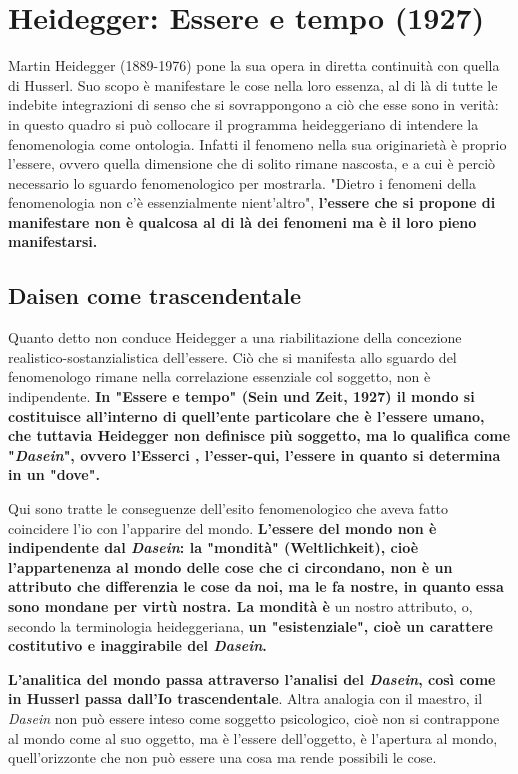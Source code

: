 \section{Heidegger: Essere e tempo (1927)}

Martin Heidegger (1889-1976) pone la sua opera in
diretta continuità con quella di Husserl. Suo scopo
è manifestare le cose nella loro essenza, al di là di
tutte le indebite integrazioni di senso che si sovrappongono a ciò che esse sono in verità: in questo quadro
si può collocare il programma heideggeriano di intendere
la fenomenologia come ontologia. Infatti il fenomeno
nella sua originarietà è proprio l'essere, ovvero quella dimensione
che di solito rimane nascosta, e a cui è perciò necessario
lo sguardo fenomenologico per mostrarla. "Dietro i
fenomeni della fenomenologia non c'è essenzialmente
nient'altro", \textbf{l'essere che si propone di manifestare non è
qualcosa al di là dei fenomeni ma è il loro pieno manifestarsi.}

\subsection{Daisen come trascendentale}

Quanto detto non conduce Heidegger a una
riabilitazione della concezione realistico-sostanzialistica dell'essere. Ciò che si manifesta allo sguardo
del fenomenologo rimane nella correlazione
essenziale col soggetto, non è indipendente.
\textbf{In "Essere e tempo" (Sein und Zeit, 1927) il mondo
si costituisce all'interno di quell'ente particolare che
è l'essere umano, che tuttavia Heidegger non
definisce più soggetto, ma lo qualifica come
"\textit{Dasein}", ovvero l'Esserci , l'esser-qui, l'essere in
quanto si determina in un "dove".}

Qui sono tratte le
conseguenze dell'esito fenomenologico che aveva fatto
coincidere l'io con l'apparire del mondo.
\textbf{L'essere del mondo non è indipendente dal \textit{Dasein}: la
"mondità" (Weltlichkeit), cioè l'appartenenza al mondo
delle cose che ci circondano, non è un attributo che
differenzia le cose da noi, ma le fa nostre, in quanto
essa sono mondane per virtù nostra. La mondità è}
un nostro attributo, o, secondo la terminologia
heideggeriana, \textbf{un "esistenziale", cioè un carattere
costitutivo e inaggirabile del \textit{Dasein}.}


\textbf{L'analitica del mondo passa attraverso l'analisi del
\textit{Dasein}, così come in Husserl passa dall'Io
trascendentale}. Altra analogia con il maestro, il
\textit{Dasein} non può essere inteso come soggetto psicologico,
cioè non si contrappone al mondo come al suo oggetto,
ma è l'essere dell'oggetto, è l'apertura al mondo,
quell'orizzonte che non può essere una cosa ma
rende possibili le cose.

